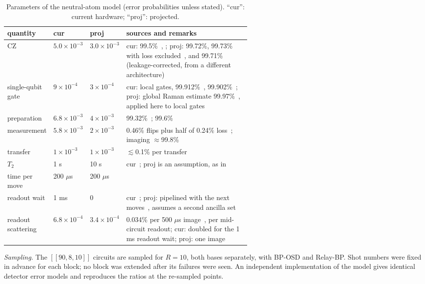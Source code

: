 \documentclass[aps,prl,twocolumn,superscriptaddress,nofootinbib]{revtex4-2}
\newcommand{\code}[1]{[[#1]]}
\begin{document}
\begin{table}[h]
\caption{Parameters of the neutral-atom model (error probabilities unless stated). ``cur'':
current hardware; ``proj'': projected.}
\label{tab:na}
\begin{ruledtabular}
\begin{tabular}{lllp{0.58\linewidth}}
quantity & cur & proj & sources and remarks\\
\hline
CZ & $5.0\times10^{-3}$ & $3.0\times10^{-3}$ & cur: 99.5\%~\cite{Evered2023}, \cite{Bluvstein2024,Bluvstein2025}; proj: 99.72\%, 99.73\% with loss
excluded~\cite{Muniz2024,Radnaev2025}, and 99.71\%~\cite{Tsai2025} (leakage-corrected, from a different architecture)\\
single-qubit gate & $9\times10^{-4}$ & $3\times10^{-4}$ & cur: local gates, 99.912\%~\cite{Bluvstein2024}, 99.902\%~\cite{Radnaev2025}; proj: global Raman estimate 99.97\%~\cite{Evered2023}, applied here to local gates\\
preparation & $6.8\times10^{-3}$ & $4\times10^{-3}$ & 99.32\%~\cite{Bluvstein2024}; 99.6\%~\cite{Evered2023}\\
measurement & $5.8\times10^{-3}$ & $2\times10^{-3}$ & 0.46\% flips plus half of 0.24\% loss~\cite{Bluvstein2025}; imaging $\approx$99.8\%~\cite{Bluvstein2024}\\
transfer & $1\times10^{-3}$ & $1\times10^{-3}$ & $\lesssim$0.1\% per transfer~\cite{Bluvstein2024}\\
$T_2$ & 1 s & 10 s & cur~\cite{Bluvstein2024,Bluvstein2025}; proj is an assumption, as in~\cite{Xu2023,Viszlai2026}\\
time per move & 200 $\mu$s & 200 $\mu$s & \cite{Bluvstein2024}\\
readout wait & 1 ms & 0 & cur~\cite{Bluvstein2024}; proj: pipelined with the next moves~\cite{Xu2023}, assumes a second ancilla set\\
readout scattering & $6.8\times10^{-4}$ & $3.4\times10^{-4}$ & 0.034\% per 500 $\mu$s image~\cite{Bluvstein2024}, per mid-circuit readout; cur: doubled for the 1 ms readout wait; proj: one image\\
\end{tabular}
\end{ruledtabular}
\end{table}

\emph{Sampling.} The $\code{90,8,10}$ circuits are sampled for $R=10$, both bases
separately, with BP-OSD and Relay-BP. Shot numbers were fixed in advance for each block; no
block was extended after its failures were seen. An independent implementation of the model
gives identical detector error models and reproduces the ratios at the re-sampled points.
\end{document}
